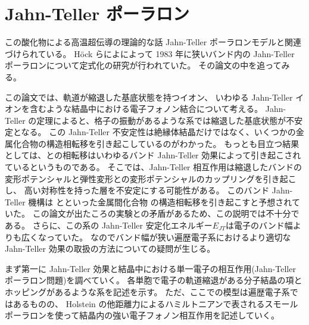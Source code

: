 \documentclass[11pt,dvipdfmx,a4paper]{jsarticle}
\begin{document}
\section{Jahn-Teller ポーラロン}
この酸化物による高温超伝導の理論的な話 Jahn-Teller ポーラロンモデルと関連づけられている。
H\"{o}ck らによによって 1983 年に狭いバンド内の Jahn-Teller ポーラロンについて定式化の研究が行われていた\cite{Hock1983}。
その論文の中を追ってみる。

この論文では、軌道が縮退した基底状態を持つイオン、
いわゆる Jahn-Teller イオンを含むような結晶中における電子フォノン結合について考える。
Jahn-Teller の定理によると、格子の振動があるような系では縮退した基底状態が不安定となる。
この Jahn-Teller 不安定性は絶縁体結晶だけではなく、いくつかの金属化合物の構造相転移を引き起こしているのがわかった。
もっとも目立つ結果としては、との相転移はいわゆるバンド Jahn-Teller 効果によって引き起こされているというものである。
そこでは、Jahn-Teller 相互作用は縮退したバンドの変形ポテンシャルと弾性変形との変形ポテンシャルのカップリングを引き起こし、
高い対称性を持った層を不安定にする可能性がある。
このバンド Jahn-Teller 機構は とといった金属間化合物
の構造相転移を引き起こすと予想されていた。
この論文が出たころの実験との矛盾があるため、この説明では不十分である。
さらに、この系の Jahn-Teller 安定化エネルギー\(E_{JT}\)は電子のバンド幅よりも広くなっていた。
なのでバンド幅が狭い遍歴電子系におけるより適切な Jahn-Teller 効果の取扱の方法についての疑問が生じる。

まず第一に Jahn-Teller 効果と結晶中における単一電子の相互作用(Jahn-Teller ポーラロン問題)を調べていく。
各単胞で電子の軌道縮退がある分子結晶の項とホッピングがあるような系を記述を示す。
ただ、ここでの模型は遍歴電子系ではあるものの、
Holstein の他距離力によるハミルトニアンで表されるスモールポーラロンを使って結晶内の強い電子フォノン相互作用を記述していく。
\end{document}
